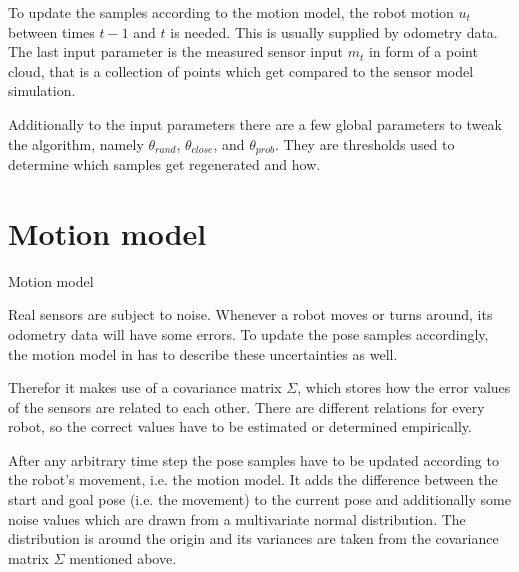 \documentclass[Thesis.tex]{subfiles}
\begin{document}
To update the samples according to the motion model, the robot motion $u_{t}$ between times $t-1$ and $t$ is needed. This is usually supplied by odometry data. The last input parameter is the measured sensor input $m_{t}$ in form of a point cloud, that is a collection of points which get compared to the sensor model simulation.

Additionally to the input parameters there are a few global parameters to tweak the algorithm, namely $\theta_{rand}$, $\theta_{close}$, and $\theta_{prob}$. They are thresholds used to determine which samples get regenerated and how.
%
%
%
%
%
%
\section{Motion model}\label{sec:motion_model_section}
%
\begin{algorithm}[!htp]
\caption{Motion model}
\label{alg:motionmodel}

\end{algorithm}
%
Real sensors are subject to noise. Whenever a robot moves or turns around, its odometry data will have some errors.
To update the pose samples accordingly, the motion model in  has to describe these uncertainties as well.

Therefor it makes use of a covariance matrix $\Sigma$, which stores how the error values of the sensors are related to each other. There are different relations for every robot, so the correct values have to be estimated or determined empirically.

After any arbitrary time step the pose samples have to be updated according to the robot's movement, i.e. the motion model. It adds the difference between the start and goal pose (i.e. the movement) to the current pose and additionally some noise values which are drawn from a multivariate normal distribution. The distribution is around the origin and its variances are taken from the covariance matrix $\Sigma$ mentioned above. 
\end{document}
